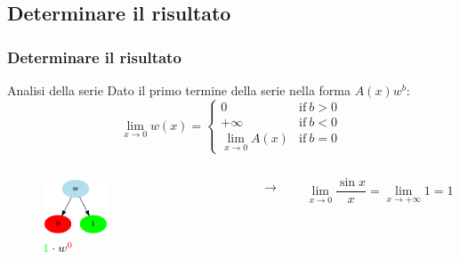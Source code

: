 \documentclass[aspectratio=149]{beamer}
\begin{document}
	\subsection{Determinare il risultato}
	
	\begin{frame}
		\frametitle{Determinare il risultato}
		\begin{block}{Analisi della serie}
			Dato il primo termine della serie nella forma \(A(x)w^b\):
			\[
			\lim_{x \to 0}{w(x)} = \begin{cases}
				0 &\text{if} \: b > 0 \\
				+\infty &\text{if} \: b < 0\\
				\lim_{x \to 0}{A(x)} &\text{if} \: b = 0
			\end{cases}
			\]
		\end{block}
	\end{frame}

	\begin{frame}
		\begin{columns}
			\begin{column}{0.45\textwidth}
				\begin{figure}
					\includegraphics[width=0.4\textwidth]{pres_img/series.png}
					\caption{\(\textcolor{green}{1} \cdot w^{\textcolor{red}{0}}\)}
				\end{figure}
			\end{column}
			\begin{column}{0.1\textwidth}
				\begin{center}
					$\rightarrow$
				\end{center}
			\end{column}
			\begin{column}{0.45\textwidth}
				\begin{center}
					\[
						\lim_{x \to 0}{\frac{\sin{x}}{x}} = \lim_{x \to +\infty}{1} = 1
					\]
				\end{center}
			\end{column}
		\end{columns}
	\end{frame}
\end{document}
